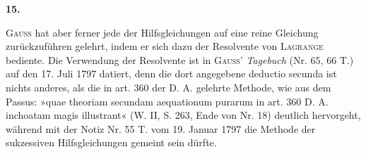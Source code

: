 \newpage{}
\begin{center}\bfseries 15.\end{center}
\noindent\hspace*{\parindent}\textsc{Gauss} hat aber ferner jede der Hilfsgleichungen auf eine reine Gleichung zurückzuführen gelehrt, indem er sich dazu der Resolvente von \textsc{Lagrange} bediente. Die Verwendung der Resolvente ist in \textsc{Gauss}’ \textit{Tagebuch} (Nr. 65, 66 T.) auf den 17. Juli 1797 datiert, denn die dort angegebene deductio secunda ist nichts anderes, als die in art. 360 der D. A. gelehrte Methode, wie aus dem Passus: »quae theoriam secundam aequationum purarum in art. 360 D. A. inchoatam magis illustrant« (W. II, S. 263, Ende von Nr. 18) deutlich hervorgeht, während mit der Notiz Nr. 55 T. vom 19. Januar 1797 die  Methode der sukzessiven Hilfsgleichungen gemeint sein dürfte.

